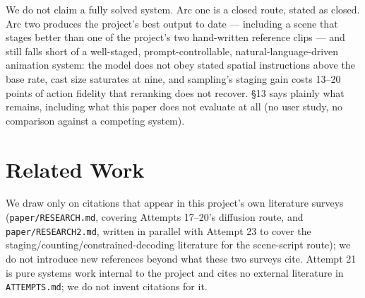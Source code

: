 \documentclass[11pt]{article}
\newcommand{\secsym}{\S}
\begin{document}
We do not claim a fully solved system. Arc one is a closed route, stated
as closed. Arc two produces the project's best output to date ---
including a scene that stages better than one of the project's two
hand-written reference clips --- and still falls short of a well-staged,
prompt-controllable, natural-language-driven animation system: the model
does not obey stated spatial instructions above the base rate, cast size
saturates at nine, and sampling's staging gain costs 13--20 points of
action fidelity that reranking does not recover. \secsym13 says plainly
what remains, including what this paper does not evaluate at all (no user
study, no comparison against a competing system).

\section{Related Work}
\label{sec:relwork}

We draw only on citations that appear in this project's own literature
surveys (\texttt{paper/RESEARCH.md}, covering Attempts 17--20's diffusion
route, and \texttt{paper/RESEARCH2.md}, written in parallel with Attempt
23 to cover the staging/counting/constrained-decoding literature for the
scene-script route); we do not introduce new references beyond what these
two surveys cite. Attempt 21 is pure systems work internal to the project
and cites no external literature in \texttt{ATTEMPTS.md}; we do not invent
citations for it.
\end{document}
